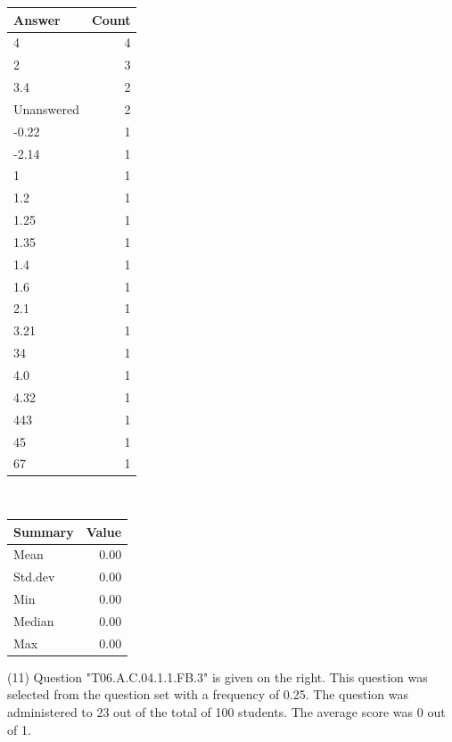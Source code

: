 \documentclass[12pt,nohyper]{tufte-handout}\usepackage[]{graphicx}\usepackage[]{color}
\begin{document}
\begin{center}%
\begin{tabular}{lr}
  \hline
Answer & Count \\ 
  \hline
4 &   4 \\ 
  2 &   3 \\ 
  3.4 &   2 \\ 
  Unanswered &   2 \\ 
  -0.22 &   1 \\ 
  -2.14 &   1 \\ 
  1 &   1 \\ 
  1.2 &   1 \\ 
  1.25 &   1 \\ 
  1.35 &   1 \\ 
  1.4 &   1 \\ 
  1.6 &   1 \\ 
  2.1 &   1 \\ 
  3.21 &   1 \\ 
  34 &   1 \\ 
  4.0 &   1 \\ 
  4.32 &   1 \\ 
  443 &   1 \\ 
  45 &   1 \\ 
  67 &   1 \\ 
   \hline
\end{tabular}
~~~~~~~~%
\begin{tabular}{lr}
  \hline
Summary & Value \\ 
  \hline
Mean & 0.00 \\ 
  Std.dev & 0.00 \\ 
  Min & 0.00 \\ 
  Median & 0.00 \\ 
  Max & 0.00 \\ 
   \hline
\end{tabular}
\end{center}\newpage{} (11) Question "T06.A.C.04.1.1.FB.3" is given on the right. This question was selected from the question set with a frequency of 0.25. The question was administered to 23 out of the total of 100 students. The average score was 0 out of 1.
\end{document}
